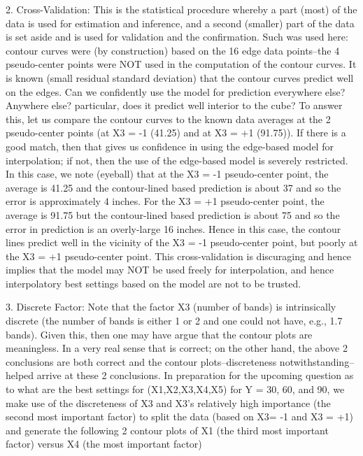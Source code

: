    2. Cross-Validation: This is the statistical
      procedure whereby a part (most) of the data
      is used for estimation and inference, and a
      second (smaller) part of the data is set
      aside and is used for validation and the
      confirmation.  Such was used here: contour
      curves were (by construction) based on the
      16 edge data points--the 4 pseudo-center
      points were NOT used in the computation of
      the contour curves.  It is known (small
      residual standard deviation) that the
      contour curves predict well on the edges.
      Can we confidently use the model for
      prediction everywhere else?  Anywhere else?
      particular, does it predict well interior to
      the cube?  To answer this, let us compare
      the contour curves to the known data
      averages at the 2 pseudo-center points (at
      X3 = -1 (41.25) and at X3 = +1 (91.75)).  If
      there is a good match, then that gives us
      confidence in using the edge-based model for
      interpolation; if not, then the use of the
      edge-based model is severely restricted.  In
      this case, we note (eyeball) that at the X3
      = -1 pseudo-center point, the average is
      41.25 and the contour-lined based prediction
      is about 37 and so the error is
      approximately 4 inches.  For the X3 = +1
      pseudo-center point, the average is 91.75
      but the contour-lined based prediction is
      about 75 and so the error in prediction is
      an overly-large 16 inches.  Hence in this
      case, the contour lines predict well in the
      vicinity of the X3 = -1 pseudo-center point,
      but poorly at the X3 = +1 pseudo-center
      point.  This cross-validation is discuraging
      and hence implies that the model may NOT be
      used freely for interpolation, and hence
      interpolatory best settings based on the
      model are not to be trusted.

   3. Discrete Factor: Note that the factor X3
      (number of bands) is intrinsically discrete
      (the number of bands is either 1 or 2 and
      one could not have, e.g., 1.7 bands).  Given
      this, then one may have argue that the
      contour plots are meaningless.  In a very
      real sense that is correct; on the other
      hand, the above 2 conclusions are both
      correct and the contour plots--discreteness
      notwithstanding--helped arrive at these 2
      conclusions.  In preparation for the
      upcoming question as to what are the best
      settings for (X1,X2,X3,X4,X5) for Y = 30,
      60, and 90, we make use of the discreteness
      of X3 and X3's relatively high importance
      (the second most important factor) to split
      the data (based on X3= -1 and X3 = +1) and
      generate the following 2 contour plots of X1
      (the third most important factor) versus X4
      (the most important factor)

